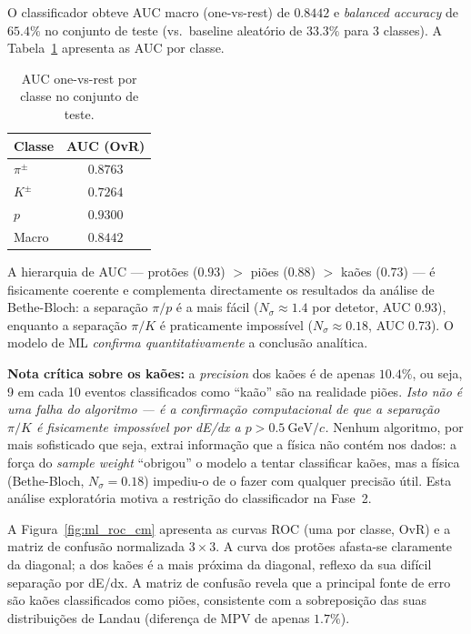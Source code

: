 \documentclass[12pt,a4paper]{article}
\begin{document}
O classificador obteve AUC macro (one-vs-rest) de $\mathbf{0.8442}$ e
\textit{balanced accuracy} de $\mathbf{65.4\%}$ no conjunto de teste
(vs.\ baseline aleatório de $33.3\%$ para 3 classes).
A Tabela~\ref{tab:ml_auc} apresenta as AUC por classe.

\begin{table}[H]
  \centering
  \caption{AUC one-vs-rest por classe no conjunto de teste.}
  \label{tab:ml_auc}
  \begin{tabular}{lc}
    \toprule
    \textbf{Classe} & \textbf{AUC (OvR)} \\
    \midrule
    $\pi^\pm$ & $0.8763$ \\
    $K^\pm$   & $0.7264$ \\
    $p$       & $0.9300$ \\
    \midrule
    Macro     & $0.8442$ \\
    \bottomrule
  \end{tabular}
\end{table}

A hierarquia de AUC — protões ($0.93$) $>$ piões ($0.88$) $>$ kaões ($0.73$)
— é fisicamente coerente e complementa directamente os resultados da análise
de Bethe-Bloch: a separação $\pi/p$ é a mais fácil ($N_\sigma \approx 1.4$
por detetor, AUC 0.93), enquanto a separação $\pi/K$ é praticamente impossível
($N_\sigma \approx 0.18$, AUC 0.73). O modelo de ML \emph{confirma
quantitativamente} a conclusão analítica.

\textbf{Nota crítica sobre os kaões:} a \textit{precision} dos kaões é de
apenas $10.4\%$, ou seja, 9 em cada 10 eventos classificados como ``kaão'' são
na realidade piões. \emph{Isto não é uma falha do algoritmo — é a confirmação
computacional de que a separação $\pi/K$ é fisicamente impossível por dE/dx a
$p > 0.5~\text{GeV}/c$.} Nenhum algoritmo, por mais sofisticado que seja,
extrai informação que a física não contém nos dados: a força do \textit{sample
weight} ``obrigou'' o modelo a tentar classificar kaões, mas a física
(Bethe-Bloch, $N_\sigma = 0.18$) impediu-o de o fazer com qualquer precisão
útil. Esta análise exploratória motiva a restrição do classificador na Fase~2.

A Figura~\ref{fig:ml_roc_cm} apresenta as curvas ROC (uma por classe, OvR)
e a matriz de confusão normalizada $3 \times 3$. A curva dos protões afasta-se
claramente da diagonal; a dos kaões é a mais próxima da diagonal, reflexo da
sua difícil separação por dE/dx. A matriz de confusão revela que a principal
fonte de erro são kaões classificados como piões, consistente com a sobreposição
das suas distribuições de Landau (diferença de MPV de apenas $1.7\%$).
\end{document}
